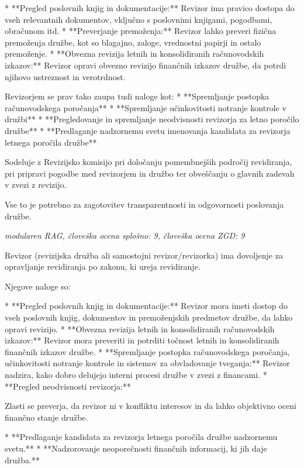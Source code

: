 \documentclass[a4paper,12pt,openright]{book}
\begin{document}
* **Pregled poslovnih knjig in dokumentacije:** Revizor ima pravico dostopa do vseh relevantnih dokumentov, vključno s poslovnimi knjigami, pogodbami, obračunom itd.
* **Preverjanje premoženja:** Revizor lahko preveri fizična premoženja družbe, kot so blagajno, zaloge, vrednostni papirji in ostalo premoženje.
* **Obvezna revizija letnih in konsolidiranih računovodskih izkazov:** Revizor opravi obvezno revizijo finančnih izkazov družbe, da potrdi njihovo ustreznost in verotrdnost.


Revizorjem se prav tako zaupa tudi naloge kot:
* **Spremljanje postopka računovodskega poročanja**
* **Spremljanje učinkovitosti notranje kontrole v družbi**
* **Pregledovanje in spremljanje neodvisnosti revizorja za letno poročilo družbe**
* **Predlaganje nadzornemu svetu imenovanja kandidata za revizorja letnega poročila družbe**


Sodeluje z Revizijsko komisijo pri določanju pomembnejših področij revidiranja, pri pripravi pogodbe med revizorjem in družbo ter obveščanju o glavnih zadevah v zvezi z revizijo.

Vse to je potrebno za zagotovitev  transparentnosti in odgovornosti poslovanja družbe.

\vspace{0.5cm}
\textit{modularen RAG, človeška ocena splošno: 9, človeška ocena ZGD: 9}

Revizor (revizijska družba ali samostojni revizor/revizorka) ima dovoljenje za opravljanje revidiranja po zakonu, ki ureja revidiranje.

Njegove naloge so:

* **Pregled poslovnih knjig in dokumentacije:** Revizor mora imeti dostop do vseh poslovnih knjig, dokumentov in premoženjskih predmetov družbe, da lahko opravi revizijo.
* **Obvezna revizija letnih in konsolidiranih računovodskih izkazov:** Revizor mora preveriti in potrditi točnost letnih in konsolidiranih finančnih izkazov družbe.
* **Spremljanje postopka računovodskega poročanja, učinkovitosti notranje kontrole in sistemov za obvladovanje tveganja:** Revizor nadzira, kako dobro delujejo interni procesi družbe v zvezi z financami.
* **Pregled neodvisnosti revizorja:**

Zlasti se preverja, da revizor ni v konfliktu interesov in da lahko objektivno oceni finančno stanje družbe.

* **Predlaganje kandidata za revizorja letnega poročila družbe nadzornemu svetu.**
* **Nadzorovanje neoporečnosti finančnih informacij, ki jih daje družba.**
\end{document}

